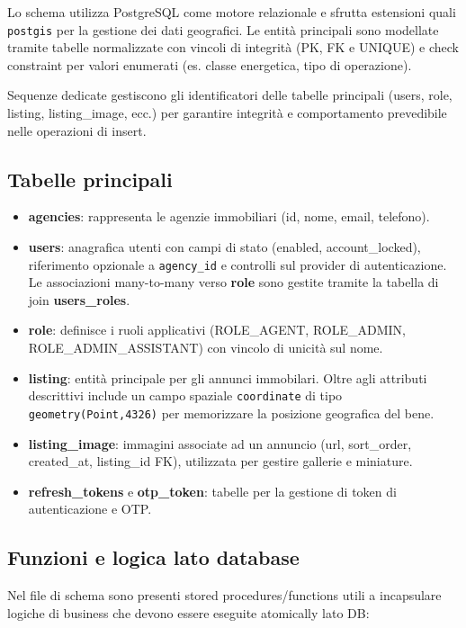 Lo schema utilizza PostgreSQL come motore relazionale e sfrutta estensioni quali \texttt{postgis} per la gestione dei dati geografici. Le entità principali sono modellate tramite tabelle normalizzate con vincoli di integrità (PK, FK e UNIQUE) e check constraint per valori enumerati (es. classe energetica, tipo di operazione).

Sequenze dedicate gestiscono gli identificatori delle tabelle principali (users, role, listing, listing\_image, ecc.) per garantire integrità e comportamento prevedibile nelle operazioni di insert.

\subsection{Tabelle principali}

\begin{itemize}
	\item  \textbf{agencies}: rappresenta le agenzie immobiliari (id, nome, email, telefono).
	
	\item  \textbf{users}: anagrafica utenti con campi di stato (enabled, account\_locked), riferimento opzionale a \texttt{agency\_id} e controlli sul provider di autenticazione. Le associazioni many-to-many verso \textbf{role} sono gestite tramite la tabella di join \textbf{users\_roles}.
	
	\item \textbf{role}: definisce i ruoli applicativi (ROLE\_AGENT, ROLE\_ADMIN, ROLE\_ADMIN\_ASSISTANT) con vincolo di unicità sul nome.
	
	\item  \textbf{listing}: entità principale per gli annunci immobilari. Oltre agli attributi descrittivi include un campo spaziale \texttt{coordinate} di tipo \texttt{geometry(Point,4326)} per memorizzare la posizione geografica del bene.
	
	\item  \textbf{listing\_image}: immagini associate ad un annuncio (url, sort\_order, created\_at, listing\_id FK), utilizzata per gestire gallerie e miniature.
	
	\item  \textbf{refresh\_tokens} e \textbf{otp\_token}: tabelle per la gestione di token di autenticazione e OTP.
\end{itemize}

\subsection{Funzioni e logica lato database}
Nel file di schema sono presenti stored procedures/functions utili a incapsulare logiche di business che devono essere eseguite atomically lato DB:

